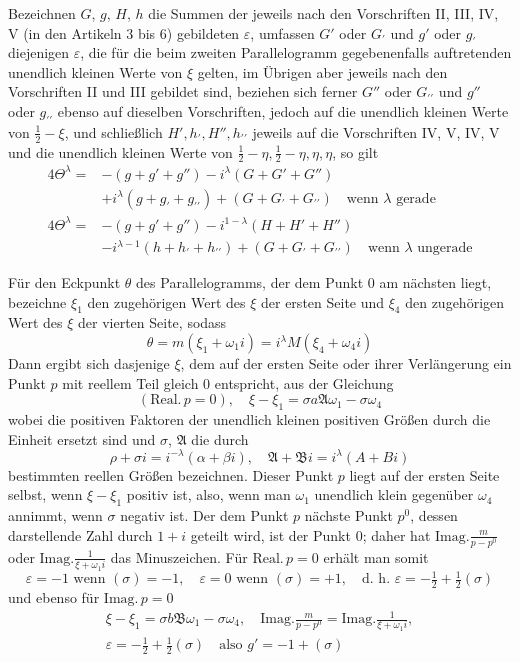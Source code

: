 Bezeichnen $G$, $g$, $H$, $h$ die Summen der jeweils nach den Vorschriften II, III, IV, V (in den Artikeln $3$ bis $6$) gebildeten $\varepsilon$, umfassen $G'$ oder $G_{\prime}$ und $g'$ oder $g_{\prime}$ diejenigen $\varepsilon$, die für die beim zweiten Parallelogramm gegebenenfalls auftretenden unendlich kleinen Werte von $\xi$ gelten, im Übrigen aber jeweils nach den Vorschriften II und III gebildet sind, beziehen sich ferner $G''$ oder $G_{\prime\prime}$ und $g''$ oder $g_{\prime\prime}$ ebenso auf dieselben Vorschriften, jedoch auf die unendlich kleinen Werte von $\tfrac12-\xi$, und schließlich $H',h_{\prime},H'',h_{\prime\prime}$ jeweils auf die Vorschriften IV, V, IV, V und die unendlich kleinen Werte von $\tfrac12-\eta,\tfrac12-\eta,\eta,\eta$, so gilt
\[
\begin{aligned}
4\Theta^\lambda={}&-(g+g'+g'')-i^\lambda(G+G'+G'')\\
&+i^\lambda(g+g_{\prime}+g_{\prime\prime})+(G+G_{\prime}+G_{\prime\prime})\quad\text{wenn }\lambda\text{ gerade}\\
4\Theta^\lambda={}&-(g+g'+g'')-i^{1-\lambda}(H+H'+H'')\\
&-i^{\lambda-1}(h+h_{\prime}+h_{\prime\prime})+(G+G_{\prime}+G_{\prime\prime})\quad\text{wenn }\lambda\text{ ungerade}
\end{aligned}
\]

Für den Eckpunkt $\theta$ des Parallelogramms, der dem Punkt $0$ am nächsten liegt, bezeichne $\xi_1$ den zugehörigen Wert des $\xi$ der ersten Seite und $\xi_4$ den zugehörigen Wert des $\xi$ der vierten Seite, sodass
\[
\theta=m(\xi_1+\omega_1i)=i^\lambda M(\xi_4+\omega_4i)
\]
Dann ergibt sich dasjenige $\xi$, dem auf der ersten Seite oder ihrer Verlängerung ein Punkt $p$ mit reellem Teil gleich $0$ entspricht, aus der Gleichung
\[
(\mathrm{Real.}\,p=0),\quad\xi-\xi_1=\sigma a\mathfrak A\omega_1-\sigma\omega_4
\]
wobei die positiven Faktoren der unendlich kleinen positiven Größen durch die Einheit ersetzt sind und $\sigma$, $\mathfrak A$ die durch
\[
\rho+\sigma i=i^{-\lambda}(\alpha+\beta i),\quad\mathfrak A+\mathfrak B i=i^\lambda(A+Bi)
\]
bestimmten reellen Größen bezeichnen. Dieser Punkt $p$ liegt auf der ersten Seite selbst, wenn $\xi-\xi_1$ positiv ist, also, wenn man $\omega_1$ unendlich klein gegenüber $\omega_4$ annimmt, wenn $\sigma$ negativ ist. Der dem Punkt $p$ nächste Punkt $p^0$, dessen darstellende Zahl durch $1+i$ geteilt wird, ist der Punkt $0$; daher hat
$\mathrm{Imag.}\frac m{p-p^0}$ oder $\mathrm{Imag.}\frac1{\xi+\omega_1i}$ das Minuszeichen. Für $\mathrm{Real.}\,p=0$ erhält man somit
\[
\varepsilon=-1\text{ wenn }(\sigma)=-1,\quad\varepsilon=0\text{ wenn }(\sigma)=+1,\quad\text{d. h. }\varepsilon=-\tfrac12+\tfrac12(\sigma)
\]
und ebenso für $\mathrm{Imag.}\,p=0$
\[
\begin{gathered}
\xi-\xi_1=\sigma b\mathfrak B\omega_1-\sigma\omega_4,\quad\mathrm{Imag.}\frac m{p-p^0}=\mathrm{Imag.}\frac1{\xi+\omega_1i},\\
\varepsilon=-\tfrac12+\tfrac12(\sigma)\quad\text{also }g'=-1+(\sigma)
\end{gathered}
\]

